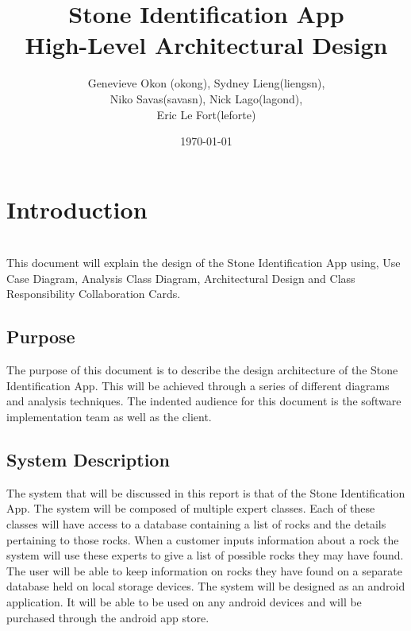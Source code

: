 \documentclass[titlepage]{article}
\title{Stone Identification App \\
	High-Level Architectural Design}
\author{Genevieve Okon (okong), Sydney Lieng(liengsn),\\
	Niko Savas(savasn), Nick Lago(lagond),\\
	Eric Le Fort(leforte)}
\date{\today}
\begin{document}
\maketitle
\newpage
\tableofcontents
\newpage


\section{Introduction}~\\
This document will explain the design of the Stone Identification App using, Use Case Diagram, Analysis Class Diagram, Architectural Design and Class Responsibility Collaboration Cards. 

\subsection{Purpose}
The purpose of this document is to describe the design architecture of the Stone Identification App. This will be achieved through a series of different diagrams and analysis techniques. The indented audience for this document is the software implementation team as well as the client.

\subsection{System Description}
The system that will be discussed in this report is that of the Stone Identification App. The system will be composed of multiple expert classes. Each of these classes will have access to a database containing a list of rocks and the details pertaining to those rocks. When a customer inputs information about a rock the system will use these experts to give a list of possible rocks they may have found. The user will be able to keep information on rocks they have found on a separate database held on local storage devices. The system will be designed as an android application. It will be able to be used on any android devices and will be purchased through the android app store. 
\end{document}
